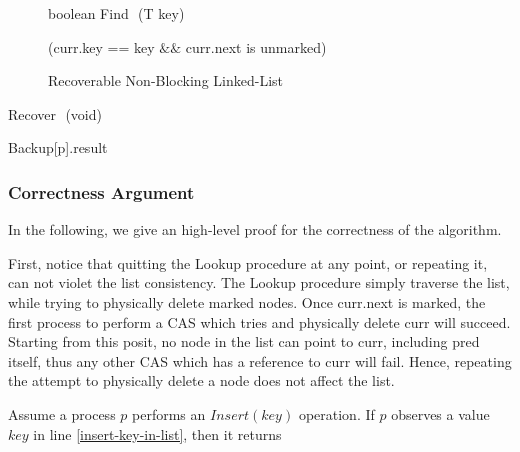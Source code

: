 \begin{figure}[h]
\begin{procedure}[H]
	\end{procedure}

	\begin{procedure}[H]
		\caption{boolean Find $ $ (T key)}
		
		
		\KwRet (curr.key == key $\&\&$ curr.next is unmarked)\;
		
	\end{procedure}

	
	\caption{Recoverable Non-Blocking Linked-List}
	\label{linked-list}
\end{figure}



\begin{procedure}[H]
	\caption{Recover $ $ (void)}
	
	 {\KwRet Backup[p].result}
	
\end{procedure}


\newpage
\subsubsection*{Correctness Argument}
In the following, we give an high-level proof for the correctness of the algorithm.

First, notice that quitting the Lookup procedure at any point, or repeating it, can not violet the list consistency. The Lookup procedure simply traverse the list, while trying to physically delete marked nodes.
Once curr.next is marked, the first process to perform a CAS which tries and physically delete curr will succeed. Starting from this posit, no node in the list can point to curr, including pred itself, thus any other CAS which has a reference to curr will fail. Hence, repeating the attempt to physically delete a node does not affect the list.

Assume a process $p$ performs an $Insert(key)$ operation. If $p$ observes a value $key$ in line \ref{insert-key-in-list}, then it returns





